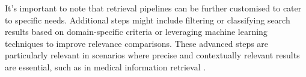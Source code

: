 It's important to note that retrieval pipelines can be further customised to cater to specific needs. Additional steps might include filtering or classifying search results based on domain-specific criteria or leveraging machine learning techniques to improve relevance comparisons. These advanced steps are particularly relevant in scenarios where precise and contextually relevant results are essential, such as in medical information retrieval \cite{lu}.
